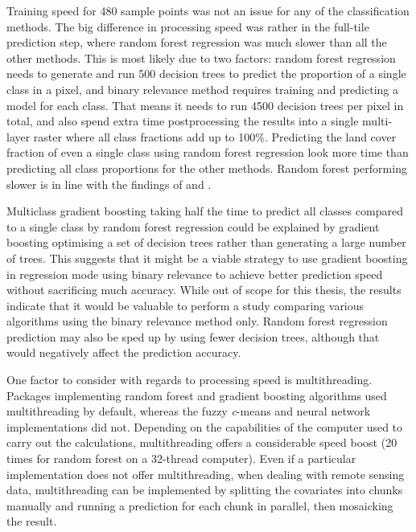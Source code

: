 \documentclass[a4paper,12pt]{scrbook}
\begin{document}
Training speed for 480 sample points was not an issue for any of the classification methods. The big difference in processing speed was rather in the full-tile prediction step, where random forest regression was much slower than all the other methods. This is most likely due to two factors: random forest regression needs to generate and run 500 decision trees to predict the proportion of a single class in a pixel, and binary relevance method requires training and predicting a model for each class. That means it needs to run 4500 decision trees per pixel in total, and also spend extra time postprocessing the results into a single multi-layer raster where all class fractions add up to 100\%. Predicting the land cover fraction of even a single class using random forest regression look more time than predicting all class proportions for the other methods. Random forest performing slower is in line with the findings of \citet{walton2008subpixelrf} and \citet{Pelletier2016hardrf}.

Multiclass gradient boosting taking half the time to predict all classes compared to a single class by random forest regression could be explained by gradient boosting optimising a set of decision trees rather than generating a large number of trees. This suggests that it might be a viable strategy to use gradient boosting in regression mode using binary relevance to achieve better prediction speed without sacrificing much accuracy. While out of scope for this thesis, the results indicate that it would be valuable to perform a study comparing various algorithms using the binary relevance method only. Random forest regression prediction may also be sped up by using fewer decision trees, although that would negatively affect the prediction accuracy.

One factor to consider with regards to processing speed is multithreading. Packages implementing random forest and gradient boosting algorithms used multithreading by default, whereas the fuzzy \textit{c}-means and neural network implementations did not. Depending on the capabilities of the computer used to carry out the calculations, multithreading offers a considerable speed boost (20 times for random forest on a 32-thread computer). Even if a particular implementation does not offer multithreading, when dealing with remote sensing data, multithreading can be implemented by splitting the covariates into chunks manually and running a prediction for each chunk in parallel, then mosaicking the result.
\end{document}
